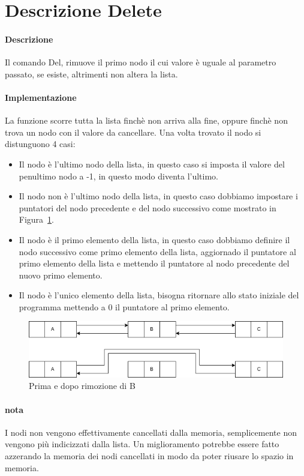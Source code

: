 \section{Descrizione Delete}

\paragraph{Descrizione}
Il comando Del, rimuove il primo nodo il cui valore è uguale al parametro passato,
se esiste, altrimenti non altera la lista.

\paragraph{Implementazione}
La funzione scorre tutta la lista finchè non arriva alla fine, oppure finchè non trova
un nodo con il valore da cancellare. Una volta trovato il nodo si distunguono 4 casi:
\begin{itemize}
    \item Il nodo è l'ultimo nodo della lista, in questo caso si imposta il valore 
    del penultimo nodo a -1, in questo modo diventa l'ultimo.
    \item Il nodo non è l'ultimo nodo della lista, in questo caso dobbiamo impostare 
    i puntatori del nodo precedente e del nodo successivo come mostrato in Figura~\ref{fig:delmiddle}.
    \item Il nodo è il primo elemento della lista, in questo caso dobbiamo definire il nodo 
    successivo come primo elemento della lista, aggiornado il puntatore al primo elemento 
    della lista e mettendo il puntatore al nodo precedente del nuovo primo elemento.
    \item Il nodo è l'unico elemento della lista, bisogna ritornare allo stato iniziale 
    del programma mettendo a 0 il puntatore al primo elemento.
\end{itemize}

\begin{figure}[h]
    \centering
    \includegraphics[scale=0.4]{diagrams/del-middle.png}
    \caption{Prima e dopo rimozione di B}
    \label{fig:delmiddle}
\end{figure}

\paragraph{nota} I nodi non vengono effettivamente cancellati dalla memoria, 
semplicemente non vengono più indicizzati dalla lista. Un miglioramento potrebbe 
essere fatto azzerando la memoria dei nodi cancellati in modo da poter riusare lo 
spazio in memoria.